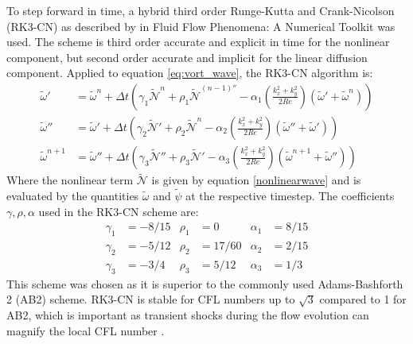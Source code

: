 \documentclass[conf]{new-aiaa}
\begin{document}
To step forward in time, a hybrid third order Runge-Kutta and Crank-Nicolson (RK3-CN) as described by \citeauthor{RK3CN} in Fluid Flow Phenomena: A Numerical Toolkit \cite{RK3CN} was used. The scheme is third order accurate and explicit in time for the nonlinear component, but second order accurate and implicit for the linear diffusion component. Applied to equation \eqref{eq:vort_wave}, the RK3-CN algorithm is:
\begin{equation}
    \begin{aligned}
        \tilde{\omega}' &= \tilde{\omega}^{n} + \Delta t(\gamma_{1}\tilde{\mathcal{N}}^{n} + \rho_{1}\tilde{\mathcal{N}}^{(n-1)''} - \alpha_{1} \left(\frac{k_{x}^{2}+k_{y}^{2}}{2Re}\right)(\tilde{\omega}'+\tilde{\omega}^{n}))\\
        \tilde{\omega}'' &= \tilde{\omega}' + \Delta t(\gamma_{2}\tilde{\mathcal{N}}' + \rho_{2}\tilde{\mathcal{N}}^{n} - \alpha_{2} \left(\frac{k_{x}^{2}+k_{y}^{2}}{2Re}\right)(\tilde{\omega}''+\tilde{\omega}'))\\
        \tilde{\omega}^{n+1} &= \tilde{\omega}'' + \Delta t(\gamma_{3}\tilde{\mathcal{N}}'' + \rho_{3}\tilde{\mathcal{N}}' - \alpha_{3} \left(\frac{k_{x}^{2}+k_{y}^{2}}{2Re}\right)(\tilde{\omega}^{n+1}+\tilde{\omega}''))
    \end{aligned}
\end{equation}
Where the nonlinear term $\tilde{\mathcal{N}}$ is given by equation \eqref{nonlinearwave} and is evaluated by the quantities $\tilde{\omega}$ and $\tilde{\psi}$ at the respective timestep. The coefficients $\gamma, \rho, \alpha$ used in the RK3-CN scheme are:
\begin{align*}
    \gamma_{1} &= -8/15 & \rho_{1} &= 0 & \alpha_{1} &= 8/15\\
    \gamma_{2} &= -5/12 & \rho_{2} &= 17/60 & \alpha_{2} &= 2/15\\
    \gamma_{3} &= -3/4 & \rho_{3} &= 5/12 & \alpha_{3} &= 1/3
\end{align*}
This scheme was chosen as it is superior to the commonly used Adams-Bashforth 2 (AB2) scheme. RK3-CN is stable for CFL numbers up to $\sqrt{3}$ compared to 1 for AB2, which is important as transient shocks during the flow evolution can magnify the local CFL number \cite{RK3CN}.
\end{document}
